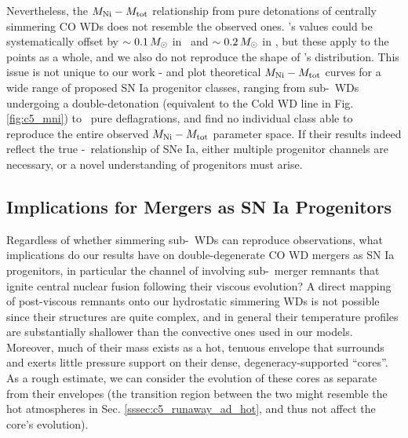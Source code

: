 

Nevertheless, the $\MNi-\Mtot$ relationship from pure detonations of centrally simmering CO WDs does not resemble the observed ones.  \cite{chil+15}'s values could be systematically offset by $\sim 0.1\,\Msun$ in \Mtot\ and $\sim 0.2\,\Msun$ in \MNi, but these apply to the points as a whole, and we also do not reproduce the shape of \cite{chil+15}'s distribution.  This issue is not unique to our work - \cite{scalzrs14} and \cite{chil+15} plot theoretical $\MNi-\Mtot$ curves for a wide range of proposed SN Ia progenitor classes, ranging from sub-\Mch\ WDs undergoing a double-detonation (equivalent to the Cold WD line in Fig. \ref{fig:c5_mni}) to \Mch\ pure deflagrations, and find no individual class able to reproduce the entire observed $\MNi-\Mtot$ parameter space.  If their results indeed reflect the true \Mtot-\Ni\ relationship of SNe Ia, either multiple progenitor channels are necessary, or a novel understanding of progenitors must arise.


\subsection{Implications for Mergers as SN Ia Progenitors}
\label{ssec:c5_implications}

Regardless of whether simmering sub-\Mch\ WDs can reproduce observations, what implications do our results have on double-degenerate CO WD mergers as SN Ia progenitors, in particular the channel of \citeal{vkercj10} involving sub-\Mch\ merger remnants that ignite central nuclear fusion following their viscous evolution?  A direct mapping of post-viscous remnants onto our hydrostatic simmering WDs is not possible since their structures are quite complex, and in general their temperature profiles are substantially shallower than the convective ones used in our models.  Moreover, much of their mass exists as a hot, tenuous envelope that surrounds and exerts little pressure support on their dense, degeneracy-supported ``cores''.  As a rough estimate, we can consider the evolution of these cores as separate from their envelopes (the transition region between the two might resemble the hot atmospheres in Sec. \ref{sssec:c5_runaway_ad_hot}, and thus not affect the core's evolution).

